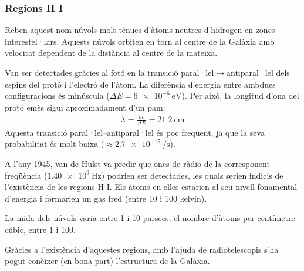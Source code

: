 \subsubsection*{Regions H I}
Reben aquest nom núvols molt tènues d'àtoms neutres d'hidrogen en zones interestel·lars. Aquests núvols orbiten en torn al centre de la Galàxia amb velocitat dependent de la distància al centre de la mateixa.

Van ser detectades gràcies al fotó en la transició paral·lel$\to$antiparal·lel dels espins del protó i l'electró de l'àtom. La diferència d'energia entre ambdues configuracions és minúscula ($\Delta E = \SI{6 e-6}{\eV}$). Per això, la longitud d'ona del protó emès sigui aproximadament d'un pam:
\begin{align}
	\lambda = \frac{hc}{\Delta E} = \SI{21.2}{\cm}
\end{align}
Aquesta transició paral·lel--antiparal·lel és poc freqüent, ja que la seva probabilitat és molt baixa ($\approx \SI{2.7 e-15}{\per\s}$).

A l'any 1945, van de Hulst va predir que ones de ràdio de la corresponent freqüència ($\SI{1.40 e9}{\Hz}$) podrien ser detectades, les quals serien indicis de l'existència de les regions H I. Els àtoms en elles estarien al seu nivell fonamental d'energia i formarien un gas fred (entre 10 i 100 kelvin).

La mida dels núvols varia entre 1 i 10 parsecs; el nombre d'àtoms per centímetre cúbic, entre 1 i 100.

Gràcies a l'existència d'aquestes regions, amb l'ajuda de radiotelescopis s'ha pogut conèixer (en bona part) l'estructura de la Galàxia.

